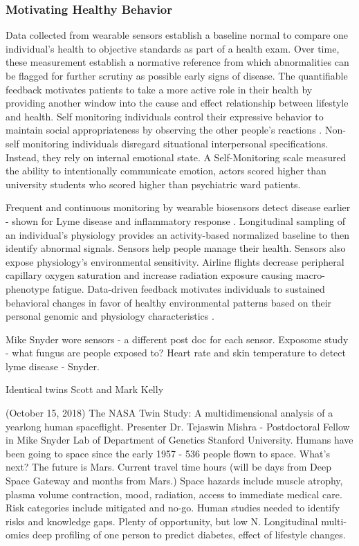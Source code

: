 \documentclass[a4paper, 11pt]{article}
\begin{document}
    \subsubsection{Motivating Healthy Behavior}
    Data collected from wearable sensors establish a baseline normal to compare one individual's health to objective standards as part of a health exam. Over time, these measurement establish a normative reference from which abnormalities can be flagged for further scrutiny as possible early signs of disease. The quantifiable feedback motivates patients to take a more active role in their health by providing another window into the cause and effect relationship between lifestyle and health. 
    Self monitoring individuals control their expressive behavior to maintain social appropriateness by observing the other people's reactions  \cite{snyder1974self}. Non-self monitoring individuals disregard situational interpersonal specifications. Instead, they rely on internal emotional state. A Self-Monitoring scale measured the ability to intentionally communicate emotion, actors scored higher than university students who scored higher than psychiatric ward patients.
    
    Frequent and continuous monitoring by wearable biosensors detect disease earlier - shown for Lyme disease and inflammatory response \cite{li2017digital}. Longitudinal sampling of an individual's physiology provides an activity-based normalized baseline to then identify abnormal signals. Sensors help people manage their health. Sensors also expose physiology's environmental sensitivity.  Airline flights decrease peripheral capillary oxygen saturation and increase radiation exposure causing macro-phenotype fatigue. 
    Data-driven feedback motivates individuals to sustained behavioral changes in favor of healthy environmental patterns based on their personal genomic and physiology characteristics \cite{kellogg2018personal}. 
    
    
     Mike Snyder wore sensors - a different post doc for each sensor. Exposome study - what fungus are people exposed to? Heart rate and skin temperature to detect lyme disease - Snyder. 
     
    
     Identical twins Scott and Mark Kelly 
     
    (October 15, 2018) The NASA Twin Study: A multidimensional analysis of a yearlong human spaceflight. Presenter Dr. Tejaswin Mishra - Postdoctoral Fellow in Mike Snyder Lab of  Department of Genetics Stanford University. 
    Humans have been going to space since the early 1957 - 536 people flown to space. What's next?
    The future is Mars. Current travel time hours (will be days from Deep Space Gateway and months from Mars.) Space hazards include muscle atrophy, plasma volume contraction, mood, radiation, access to immediate medical care. Risk categories include mitigated and no-go. 
    Human studies needed to identify risks and knowledge gaps. Plenty of opportunity, but low N. Longitudinal multi-omics deep profiling of one person to predict diabetes, effect of lifestyle changes.
    
\end{document}
